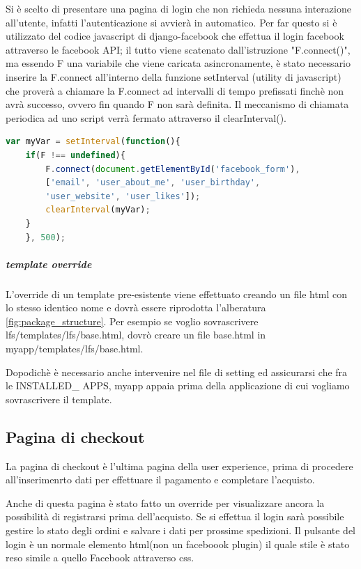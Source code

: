Si è scelto di presentare una pagina di login che non richieda nessuna interazione all'utente, infatti l'autenticazione si avvierà in automatico. Per far questo si è utilizzato del codice javascript di django-facebook che effettua il login facebook attraverso le facebook API; il tutto viene scatenato dall'istruzione "F.connect()", ma essendo F una variabile che viene caricata asincronamente, è stato necessario inserire la F.connect all'interno della funzione setInterval (utility di javascript) che proverà a chiamare la F.connect ad intervalli di tempo prefissati finchè non avrà successo, ovvero fin quando F non sarà definita. Il meccanismo di chiamata periodica ad uno script verrà fermato attraverso il clearInterval().

\begin{lstlisting}[language=JavaScript]
var myVar = setInterval(function(){
    if(F !== undefined){
        F.connect(document.getElementById('facebook_form'), 
        ['email', 'user_about_me', 'user_birthday', 
        'user_website', 'user_likes']);
        clearInterval(myVar);
    }
    }, 500);
\end{lstlisting}

\subparagraph{template override}
L'override di un template pre-esistente viene effettuato creando un file html con lo stesso identico nome e dovrà essere riprodotta l'alberatura \ref{fig:package_structure}. Per esempio se voglio sovrascrivere lfs/templates/lfs/base.html, dovrò creare un file base.html in myapp/templates/lfs/base.html. 

Dopodichè è necessario anche intervenire nel file di setting ed assicurarsi che fra le INSTALLED\_ APPS, myapp appaia prima della applicazione di cui vogliamo sovrascrivere il template.

\subsection{Pagina di checkout}
La pagina di checkout è l'ultima pagina della user experience, prima di procedere all'inserimenrto dati per effettuare il pagamento e completare l'acquisto.

Anche di questa pagina è stato fatto un override per visualizzare ancora la possibilità di registrarsi prima dell'acquisto. Se si effettua il login sarà possibile gestire lo stato degli ordini e salvare i dati per prossime spedizioni. Il pulsante del login è un normale elemento html(non un faceboook plugin) il quale stile è stato reso simile a quello Facebook attraverso css. 


